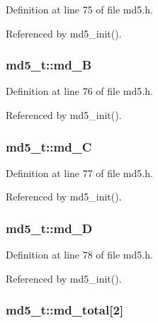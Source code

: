 Definition at line 75 of file md5.h.

Referenced by md5\_\-init().\hypertarget{structmd5__t_1613a6a739dd0837c00af0e9a691b1e5}{
\subsubsection[md\_\-B]{ {\bf md5\_\-t::md\_\-B}}}
\label{structmd5__t_1613a6a739dd0837c00af0e9a691b1e5}




Definition at line 76 of file md5.h.

Referenced by md5\_\-init().\hypertarget{structmd5__t_3d36bb26874ed330b76a40081317de8f}{
\subsubsection[md\_\-C]{ {\bf md5\_\-t::md\_\-C}}}
\label{structmd5__t_3d36bb26874ed330b76a40081317de8f}




Definition at line 77 of file md5.h.

Referenced by md5\_\-init().\hypertarget{structmd5__t_e4ca777e18b5fc82bf2ba0fd5a5b6ae6}{
\subsubsection[md\_\-D]{ {\bf md5\_\-t::md\_\-D}}}
\label{structmd5__t_e4ca777e18b5fc82bf2ba0fd5a5b6ae6}




Definition at line 78 of file md5.h.

Referenced by md5\_\-init().\hypertarget{structmd5__t_9169c98caf650a252cd2dbf3e4544498}{
\subsubsection[md\_\-total]{ {\bf md5\_\-t::md\_\-total}\mbox{[}2\mbox{]}}}
\label{structmd5__t_9169c98caf650a252cd2dbf3e4544498}




